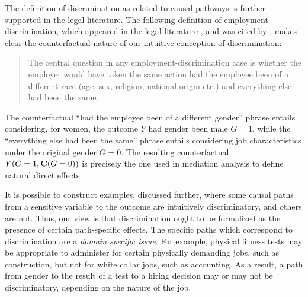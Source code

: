 \documentclass[letterpaper]{article} %
\newcommand{\citep}{\cite}
\begin{document}
The definition of discrimination as related to causal pathways is further supported in the legal literature. The following definition of employment discrimination, which appeared in the legal literature \citep{carson96discrimination}, and was cited by \citep{pearl09causality}, makes clear the counterfactual nature of our intuitive conception of discrimination: 
\begin{quote}
The central question in any employment-discrimination case is whether the employer would have taken the same action had the employee been of a different race (age, sex, religion, national origin etc.) and everything else had been the same.
\end{quote}
The counterfactual ``had the employee been of a different gender'' phrase entails considering, for women, the outcome $Y$ had gender been male $G=1$, while
the ``everything else had been the same'' phrase entails considering job characteristics under the original gender $G=0$.  The resulting counterfactual
$Y(G=1,{\bf C}(G=0))$ is precisely the one used in mediation analysis to define natural direct effects.

It is possible to construct examples, discussed further, where some causal paths from a sensitive variable to the outcome are intuitively discriminatory, and others are not. Thus, our view is that discrimination ought to be formalized as the presence of certain path-specific effects.  The specific paths which correspond to discrimination are a \emph{domain specific issue}.  For example, physical fitness tests may be appropriate to administer for certain physically demanding jobs, such as construction, but not for white collar jobs, such as accounting.  As a result, a path from gender to the result of a test to a hiring decision may or may not be discriminatory, depending on the nature of the job.
\end{document}
